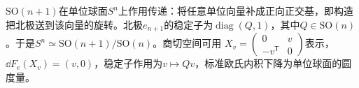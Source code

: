 \begin{example}[球面的齐性表示]
$\mathrm{SO}(n+1)$在单位球面$S^n$上作用传递：将任意单位向量补成正向正交基，即构造把北极送到该向量的旋转。北极$e_{n+1}$的稳定子为$\operatorname{diag}(Q,1)$，其中$Q\in\mathrm{SO}(n)$。于是$S^n\simeq\mathrm{SO}(n+1)/\mathrm{SO}(n)$。商切空间可用
$X_v=\left(\begin{smallmatrix}0&v\\-v^{\mathsf T}&0\end{smallmatrix}\right)$表示，$\dd F_e(X_v)=(v,0)$，稳定子作用为$v\mapsto Qv$，标准欧氏内积下降为单位球面的圆度量。
\end{example}
